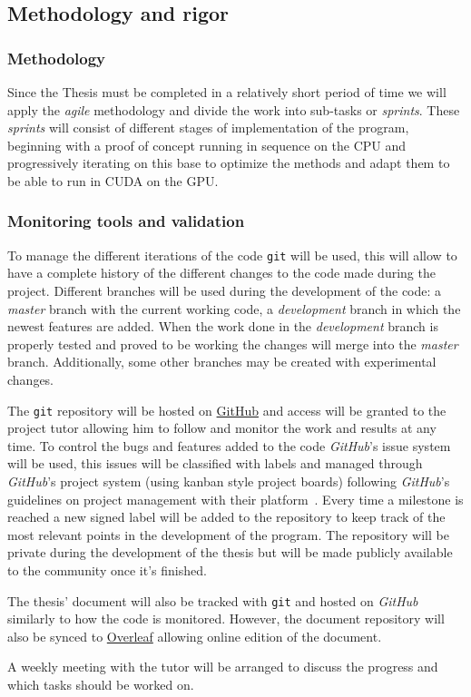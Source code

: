 \pagebreak
\subsection{Methodology and rigor}

\subsubsection{Methodology}

Since the Thesis must be completed in a relatively short period of time we will
apply the \emph{agile} methodology and divide the work into sub-tasks or
\emph{sprints}. These \emph{sprints} will consist of different stages of
implementation of the program, beginning with a proof of concept running in
sequence on the CPU and progressively iterating on this base to optimize the
methods and adapt them to be able to run in CUDA on the GPU.

\subsubsection{Monitoring tools and validation}

To manage the different iterations of the code \texttt{git} will be used,
this will allow to have a complete history of the different changes to the code
made during the project. Different branches will be used during the development
of the code: a \emph{master} branch with the current working code, a
\emph{development} branch in which the newest features are added. When the work done
in the \emph{development} branch is properly tested and proved to be working the
changes will merge into the \emph{master} branch. Additionally, some
other branches may be created with experimental changes.

The \texttt{git} repository will be hosted on \href{github.com}{GitHub} and
access will be granted to the project tutor allowing him to follow and monitor
the work and results at any time. To control the bugs and features added to the
code \emph{GitHub}'s issue system will be used, this issues will be classified
with labels and managed through \emph{GitHub}'s project system (using kanban style
project boards) following \emph{GitHub}'s guidelines on project management with
their platform~\cite{github_managing_2021}.  Every time a milestone is reached a
new signed label will be added to the repository to keep track of the most
relevant points in the development of the program. The repository will be
private during the development of the thesis but will be made publicly available
to the community once it's finished.

The thesis' document will also be tracked with \texttt{git} and hosted on
\emph{GitHub} similarly to how the code is monitored. However, the document
repository will also be synced to \href{overleaf.com}{Overleaf} allowing online
edition of the document.

A weekly meeting with the tutor will be arranged to discuss the progress and
which tasks should be worked on.
